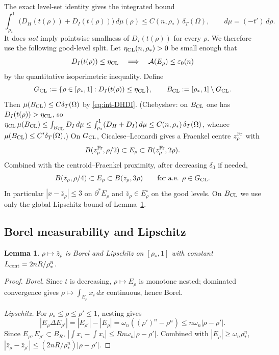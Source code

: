 \documentclass[11pt]{article}
\newtheorem{lemma}[theorem]{Lemma}
\theoremstyle{definition}
\newcommand{\Om}{\Omega}
\newcommand{\eps}{\varepsilon}
\newcommand{\rstar}{\rho_{*}}
\newcommand{\zbar}{\bar z_{\rho}}
\begin{document}
The exact level-set identity gives the integrated bound
\begin{equation}\label{eq:int-DHDI}
   \int_{\rstar}^{1}\bigl(D_H(t(\rho))+D_I(t(\rho))\bigr)\,d\mu(\rho)
   \le C(n,\rstar)\,\delta_T(\Om),
   \qquad d\mu=(-t')\,d\rho.
\end{equation}
It does \emph{not} imply pointwise smallness of \(D_I(t(\rho))\) for
every \(\rho\). We therefore use the following good-level split. Let
\(\eta_{\rm CL}(n,\rstar)>0\) be small enough that
\[
   D_I(t(\rho))\le\eta_{\rm CL}
   \quad\Longrightarrow\quad
   \mathcal A(E_\rho)\le\eps_0(n)
\]
by the quantitative isoperimetric inequality. Define
\[
   G_{\rm CL}:=\{\rho\in[\rstar,1]:D_I(t(\rho))\le\eta_{\rm CL}\},
   \qquad B_{\rm CL}:=[\rstar,1]\setminus G_{\rm CL}.
\]
Then \(\mu(B_{\rm CL})\le C\delta_T(\Om)\) by
\eqref{eq:int-DHDI}. (Chebyshev: on $B_{\rm CL}$ one has $D_I(t(\rho))
>\eta_{\rm CL}$, so $\eta_{\rm CL}\,\mu(B_{\rm CL}) \le
\int_{B_{\rm CL}}D_I\,d\mu \le \int_{\rstar}^{1}(D_H+D_I)\,d\mu
\le C(n,\rstar)\,\delta_T(\Om)$, whence
$\mu(B_{\rm CL})\le C'\delta_T(\Om)$.)
On \(G_{\rm CL}\), Cicalese--Leonardi gives a
Fraenkel centre \(z^{\rm Fr}_\rho\) with
\begin{equation}\label{eq:CL}
   B(z^{\rm Fr}_\rho,\rho/2)\subset E_\rho\subset B(z^{\rm Fr}_\rho,2\rho).
\end{equation}
Combined with the centroid--Fraenkel proximity, after decreasing
\(\delta_0\) if needed,
\[
   B(\zbar,\rho/4)\subset E_\rho\subset B(\zbar,3\rho)
   \qquad\text{for a.e. }\rho\in G_{\rm CL}.
\]
In particular \(|x-\zbar|\le 3\) on \(\partial^*E_\rho\) and
\(\zbar\in E_\rho^\circ\) on the good levels. On \(B_{\rm CL}\) we use
only the global Lipschitz bound of Lemma~\ref{lem:Lip}.

\subsection{Borel measurability and Lipschitz}

\begin{lemma}\label{lem:Lip}
$\rho\mapsto\zbar$ is Borel and Lipschitz on $[\rstar,1]$ with
constant $L_{\rm cent}=2nR/\rstar^{n}$.
\end{lemma}

\begin{proof}
\emph{Borel.} Since $t$ is decreasing, $\rho\mapsto E_\rho$ is monotone
nested; dominated convergence gives $\rho\mapsto\int_{E_\rho}x_i\,dx$
continuous, hence Borel.

\emph{Lipschitz.} For $\rstar\le\rho\le\rho'\le 1$, nesting gives
\[
   |E_\rho\Delta E_{\rho'}|=|E_{\rho'}|-|E_\rho|
   =\omega_n((\rho')^n-\rho^n)\le n\omega_n|\rho-\rho'|.
\]
Since $E_\rho,E_{\rho'}\subset B_R$,
$|\int x_i-\int x_i|\le Rn\omega_n|\rho-\rho'|$. Combined with
$|E_\rho|\ge\omega_n\rstar^n$,
$|\zbar-\bar z_{\rho'}|\le (2nR/\rstar^n)|\rho-\rho'|$.
\end{proof}
\end{document}
